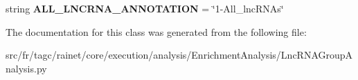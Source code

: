 \begin{DoxyCompactItemize}
\item 
\hypertarget{classsrc_1_1fr_1_1tagc_1_1rainet_1_1core_1_1execution_1_1analysis_1_1EnrichmentAnalysis_1_1LncRNe08e6e334d3ac6c2229a1d8a0df9192a_afe24783e86d82659fa9c32b20e60c950}{string {\bfseries A\-L\-L\-\_\-\-L\-N\-C\-R\-N\-A\-\_\-\-A\-N\-N\-O\-T\-A\-T\-I\-O\-N} = \char`\"{}1-\/All\-\_\-lnc\-R\-N\-As\char`\"{}}\label{classsrc_1_1fr_1_1tagc_1_1rainet_1_1core_1_1execution_1_1analysis_1_1EnrichmentAnalysis_1_1LncRNe08e6e334d3ac6c2229a1d8a0df9192a_afe24783e86d82659fa9c32b20e60c950}

\end{DoxyCompactItemize}


The documentation for this class was generated from the following file\-:\begin{DoxyCompactItemize}
\item 
src/fr/tagc/rainet/core/execution/analysis/\-Enrichment\-Analysis/Lnc\-R\-N\-A\-Group\-Analysis.\-py\end{DoxyCompactItemize}
